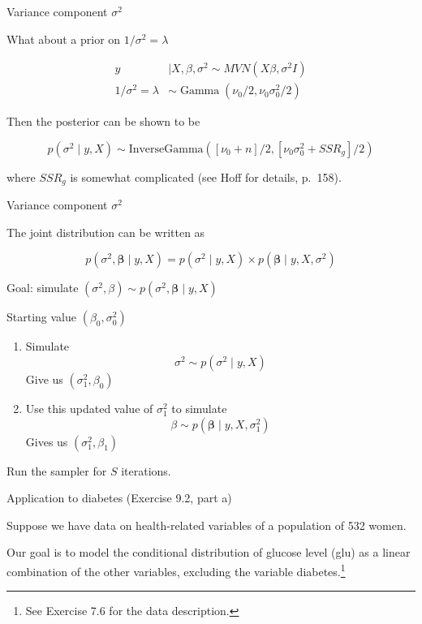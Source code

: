 \documentclass[ignorenonframetext,]{beamer}
\DeclareMathOperator*{\Ga}{Gamma}
\newcommand{\bbeta}{\bm{\beta}}
\begin{document}
\begin{frame}{Variance component \(\sigma^2\)}

What about a prior on \(1/\sigma^2 = \lambda\)

\begin{align}
y &\mid X,\beta, \sigma^2 \sim MVN( X\beta, \sigma^2 I) \\
1/\sigma^2 = \lambda &\sim \Ga(\nu_0/2,\nu_0 \sigma_0^2 /2)
\end{align}

Then the posterior can be shown to be

\[p(\sigma^2 \mid y, X) 
\sim \text{InverseGamma}([\nu_0 + n]/2,[\nu_0 \sigma_0^2 + SSR_g]/2)\]

where \(SSR_g\) is somewhat complicated (see Hoff for details, p.~158).

\end{frame}

\begin{frame}{Variance component \(\sigma^2\)}

The joint distribution can be written as

\[p(\sigma^2, \bbeta \mid y, X) = p(\sigma^2 \mid y, X) \times p(\bbeta \mid y,X, \sigma^2)\]

Goal: simulate \((\sigma^2, \beta) \sim p(\sigma^2, \bbeta \mid y, X)\)

Starting value \((\beta_0, \sigma^2_0)\)

\begin{enumerate}
\def\labelenumi{\arabic{enumi}.}
\item
  Simulate \[\sigma^2 \sim p(\sigma^2 \mid y, X)\] Give us
  \((\sigma^2_1,\beta_0)\)
\item
  Use this updated value of \(\sigma^2_1\) to simulate
  \[\beta \sim p(\bbeta \mid y,X, \sigma^2_1)\] Gives us
  \((\sigma^2_1, \beta_1)\)
\end{enumerate}

Run the sampler for \(S\) iterations.

\end{frame}

\begin{frame}{Application to diabetes (Exercise 9.2, part a)}

Suppose we have data on health-related variables of a population of 532
women.

Our goal is to model the conditional distribution of glucose level (glu)
as a linear combination of the other variables, excluding the variable
diabetes.\footnote{See Exercise 7.6 for the data description.}

\end{frame}
\end{document}
